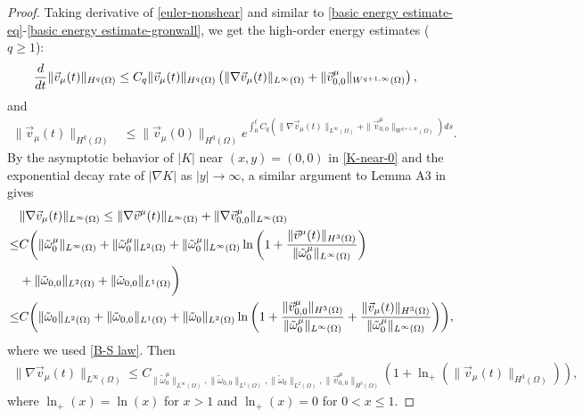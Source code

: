 \documentclass[1 [leqno, 11pt]{amsart}
\numberwithin{equation}{section}
\begin{document}
\begin{CJK*}{GBK}{song}
\begin{appendix}
\begin{proof}
 Taking derivative of \eqref{euler-nonshear} and similar to \eqref{basic energy estimate-eq}-\eqref{basic energy estimate-gronwall}, we get the high-order energy estimates ($q\geq1$):
 \begin{align}\nonumber
 {d\over dt}\|\vec{v}_{\mu}(t)\|_{H^q(\Omega)}&\leq C_q \|\vec{v}_{\mu}(t)\|_{H^q(\Omega)}\left(\|\nabla \vec{v}_{\mu}(t)\|_{L^\infty(\Omega)}+\|\vec{v}_{0,0}^{\mu}\|_{W^{q+1,\infty}(\Omega)}\right),
 \end{align}
 and
 \begin{align}\label{basic energy estimate-gronwall-high-order}
\|\vec{v}_{\mu}(t)\|_{H^q(\Omega)}&\leq \|\vec{v}_{\mu}(0)\|_{H^q(\Omega)}e^{\int_0^tC_q\left(\|\nabla \vec{v}_{\mu}(t)\|_{L^\infty(\Omega)}+\|\vec{v}_{0,0}^{\mu}\|_{W^{q+1,\infty}(\Omega)}\right)ds}.
 \end{align}
By the asymptotic behavior of $|K|$ near $(x,y)=(0,0)$ in  \eqref{K-near-0} and the exponential decay rate of $|\nabla K|$ as $|y|\to \infty$, a similar argument to Lemma A3 in \cite{Kato1986nonlinear} gives
\begin{align*}
&\|\nabla\vec{v}_{\mu}(t)\|_{L^\infty(\Omega)}\leq\|\nabla\vec{v}^{\mu}(t)\|_{L^\infty(\Omega)}+\|\nabla\vec{v}_{0,0}^{\mu}\|_{L^\infty(\Omega)}\\
\leq&
 C\bigg(\|\tilde\omega_{0}^\mu\|_{L^\infty(\Omega)}+\|\tilde\omega_{0}^\mu\|_{L^2(\Omega)}
+\|\tilde\omega_{0}^\mu\|_{L^\infty(\Omega)}
\ln\left(1+{\|\vec{v}^{\mu}(t)\|_{H^3(\Omega)}\over\|\tilde\omega_{0}^\mu\|_{L^\infty(\Omega)}}\right)\\
&+\|\tilde\omega_{0,0}\|_{L^2(\Omega)}+\|\tilde\omega_{0,0}\|_{L^1(\Omega)}\bigg)\\
\leq&C\bigg(\|\tilde\omega_{0}\|_{L^2(\Omega)}+\|\tilde\omega_{0,0}\|_{L^1(\Omega)}+\|\tilde\omega_{0}\|_{L^2(\Omega)}
\ln\bigg(1+{\|\vec{v}_{0,0}^{\mu}\|_{H^3(\Omega)}\over\|\tilde\omega_{0}^\mu\|_{L^\infty(\Omega)}}+
{\|\vec{v}_{\mu}(t)\|_{H^3(\Omega)}\over\|\tilde\omega_{0}^\mu\|_{L^\infty(\Omega)}}\bigg)\bigg),
\end{align*}
where we used \eqref{B-S law}.
 Then
\begin{align}\label{estimate-v-kappa-L-infty}
\|\nabla\vec{v}_{\mu}(t)\|_{L^\infty(\Omega)}\leq C_{\|\tilde\omega_{0}^\mu\|_{L^\infty(\Omega)},\|\tilde\omega_{0,0}\|_{L^1(\Omega)},\|\tilde\omega_0\|_{L^2(\Omega)},\|\vec{v}_{0,0}^{\mu}\|_{H^3(\Omega)}}\left(1+
\ln_+(\|\vec{v}_{\mu}(t)\|_{H^3(\Omega)})\right),
\end{align}
where $\ln_+(x)=\ln(x)$ for $x>1$ and $\ln_+(x)=0$ for $0<x\leq1$.

\end{proof}
\end{appendix}
\end{CJK*}
\end{document}

